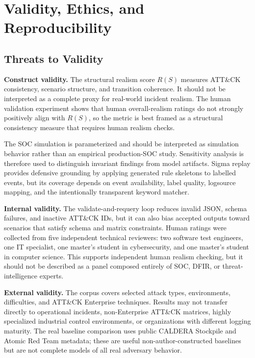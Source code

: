 
\section{Validity, Ethics, and Reproducibility}

\subsection{Threats to Validity}

\textbf{Construct validity.}
The structural realism score $R(S)$ measures ATT\&CK consistency, scenario
structure, and transition coherence. It should not be interpreted as a complete
proxy for real-world incident realism. The human validation experiment shows
that human overall-realism ratings do not strongly positively align with
$R(S)$, so the metric is best framed as a structural consistency measure that
requires human realism checks.

The SOC simulation is parameterized and should be interpreted as simulation
behavior rather than an empirical production-SOC study. Sensitivity analysis is
therefore used to distinguish invariant findings from model artifacts. Sigma
replay provides defensive grounding by applying generated rule skeletons to
labelled events, but its coverage depends on event availability, label quality,
logsource mapping, and the intentionally transparent keyword matcher.

\textbf{Internal validity.}
The validate-and-requery loop reduces invalid JSON, schema failures, and
inactive ATT\&CK IDs, but it can also bias accepted outputs toward scenarios
that satisfy schema and matrix constraints. Human ratings were collected from
five independent technical reviewers: two software test engineers, one IT
specialist, one master's student in cybersecurity, and one master's student in
computer science. This supports independent human realism checking, but it
should not be described as a panel composed entirely of SOC, DFIR, or
threat-intelligence experts.

\textbf{External validity.}
The corpus covers selected attack types, environments, difficulties, and
ATT\&CK Enterprise techniques. Results may not transfer directly to operational
incidents, non-Enterprise ATT\&CK matrices, highly specialized industrial
control environments, or organizations with different logging maturity. The real
baseline comparison uses public CALDERA Stockpile and Atomic Red Team metadata;
these are useful non-author-constructed baselines but are not complete models of
all real adversary behavior.

